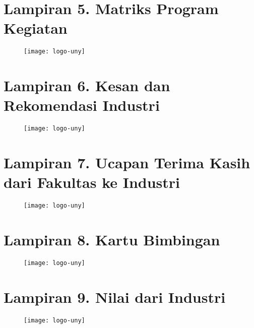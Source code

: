 \newpage

\section*{Lampiran 5. Matriks Program Kegiatan}
\begin{figure}[H]
	\centering
	\texttt{[image: logo-uny]}
\end{figure}

\newpage

\section*{Lampiran 6. Kesan dan Rekomendasi Industri}
\begin{figure}[H]
	\centering
	\texttt{[image: logo-uny]}
\end{figure}

\newpage

\section*{Lampiran 7. Ucapan Terima Kasih dari Fakultas ke Industri}
\begin{figure}[H]
	\centering
	\texttt{[image: logo-uny]}
\end{figure}

\newpage

\section*{Lampiran 8. Kartu Bimbingan}
\begin{figure}[H]
	\centering
	\texttt{[image: logo-uny]}
\end{figure}

\newpage

\section*{Lampiran 9. Nilai dari Industri}
\begin{figure}[H]
	\centering
	\texttt{[image: logo-uny]}
\end{figure}

